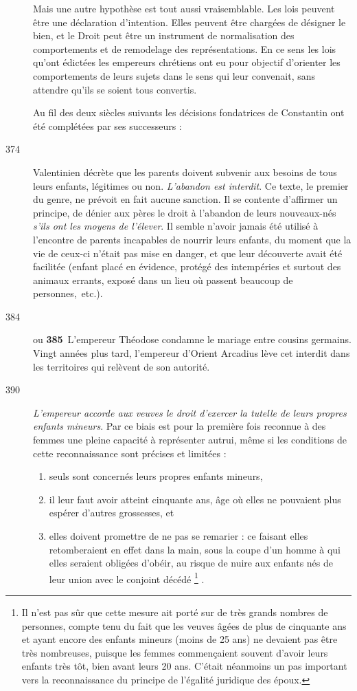 \begin{description}
 Mais une autre hypothèse est tout aussi vraisemblable. Les lois peuvent être une déclaration d'intention. Elles peuvent être chargées de désigner le bien, et le Droit peut être un instrument de normalisation des comportements et de remodelage des représentations. En ce sens les lois qu'ont édictées les empereurs chrétiens ont eu pour objectif d'orienter les comportements de leurs sujets dans le sens qui leur convenait, sans attendre qu'ils se soient tous convertis. 

 Au fil des deux siècles suivants les décisions fondatrices de Constantin ont été complétées par ses successeurs : 

\item[374] Valentinien décrète que les parents doivent subvenir aux besoins de tous leurs enfants, légitimes ou non. \emph{L'abandon est interdit}. Ce texte, le premier du genre, ne prévoit en fait aucune sanction. Il se contente d'affirmer un principe, de dénier aux pères le droit à l'abandon de leurs nouveaux-nés \emph{s'ils ont les moyens de l'élever}. Il semble n'avoir jamais été utilisé à l'encontre de parents incapables de nourrir leurs enfants, du moment que la vie de ceux-ci n'était pas mise en danger, et que leur découverte avait été facilitée (enfant placé en évidence, protégé des intempéries et surtout des animaux errants, exposé dans un lieu où passent beaucoup de personnes,~etc.). 

\item[384] $\!$ou \textbf{385}\,{} L'empereur Théodose condamne le mariage entre cousins germains. Vingt années plus tard, l'empereur d'Orient Arcadius lève cet interdit dans les territoires qui relèvent de son autorité. 

\item[390] \emph{L'empereur accorde aux veuves le droit d'exercer la tutelle de leurs propres enfants mineurs}. Par ce biais est pour la première fois reconnue à des femmes une pleine capacité à représenter autrui, même si les conditions de cette reconnaissance sont précises et limitées :
\begin{enumerate}[leftmargin=*,itemsep=0pt]
\item seuls sont concernés leurs propres enfants mineurs,
\item il leur faut avoir atteint cinquante ans, âge où elles ne pouvaient plus espérer d'autres grossesses, et
\item elles doivent promettre de ne pas se remarier : ce faisant elles retomberaient en effet dans la main, sous la coupe d'un homme à qui elles seraient obligées d'obéir, au risque de nuire aux enfants nés de leur union avec le conjoint décédé%
\footnote{Il n'est pas sûr que cette mesure ait porté sur de très grands nombres de personnes, compte tenu du fait que les veuves âgées de plus de cinquante ans et ayant encore des enfants mineurs (moins de 25 ans) ne devaient pas être très nombreuses, puisque les femmes commençaient souvent d'avoir leurs enfants très tôt, bien avant leurs 20 ans. C'était néanmoins un pas important vers la reconnaissance du principe de l'égalité juridique des époux.}%
.
\end{enumerate}


\end{description}
